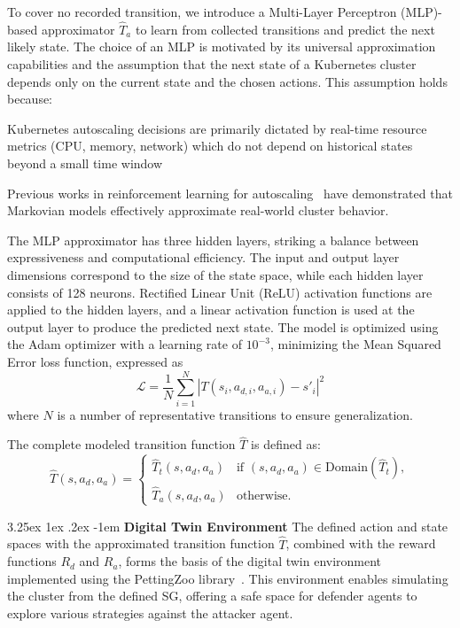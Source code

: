 \documentclass[conference]{IEEEtran}
\makeatletter
\renewcommand\paragraph{\@startsection{paragraph}{5}{\z@}%
  {3.25ex \@plus1ex \@minus.2ex}%
  {-1em}%
  {\normalfont\normalsize\bfseries}}
\makeatother
\begin{document}
To cover no recorded transition, we introduce a Multi-Layer Perceptron (MLP)-based approximator $\hat{T}_a$ to learn from collected transitions and predict the next likely state. The choice of an MLP is motivated by its universal approximation capabilities and the assumption that the next state of a Kubernetes cluster depends only on the current state and the chosen actions. This assumption holds because:
\begin{enumerate*}[label={\roman*)}, itemjoin={;\quad }]
    \item Kubernetes autoscaling decisions are primarily dictated by real-time resource metrics (CPU, memory, network) which do not depend on historical states beyond a small time window
    \item Previous works in reinforcement learning for autoscaling~\cite{Gari2021} have demonstrated that Markovian models effectively approximate real-world cluster behavior.
\end{enumerate*}
The MLP approximator has three hidden layers, striking a balance between expressiveness and computational efficiency. The input and output layer dimensions correspond to the size of the state space, while each hidden layer consists of 128 neurons. Rectified Linear Unit (ReLU) activation functions are applied to the hidden layers, and a linear activation function is used at the output layer to produce the predicted next state. The model is optimized using the Adam optimizer with a learning rate of $10^{-3}$, minimizing the Mean Squared Error loss function, expressed as
$$
    \mathcal{L} = \frac{1}{N} \sum_{i=1}^N |T(s_i, a_{d,i}, a_{a,i}) - s'_i|^2
$$
where $N$ is a number of representative transitions to ensure generalization.

The complete modeled transition function $\hat{T}$ is defined as:
$$
    \hat{T}(s, a_d, a_a) =
    \begin{cases}
        \hat{T}_t(s, a_d, a_a) & \text{if } (s, a_d, a_a) \in \text{Domain}(\hat{T}_t), \\
        \hat{T}_a(s, a_d, a_a) & \text{otherwise}.
    \end{cases}
$$

\noindent \paragraph{\textbf{Digital Twin Environment}} The defined action and state spaces with the approximated transition function $\hat{T}$, combined with the reward functions $R_d$ and $R_a$, forms the basis of the digital twin environment implemented using the PettingZoo library~\cite{Terry2021}. This environment enables simulating the cluster from the defined SG, offering a safe space for defender agents to explore various strategies against the attacker agent.
\end{document}
